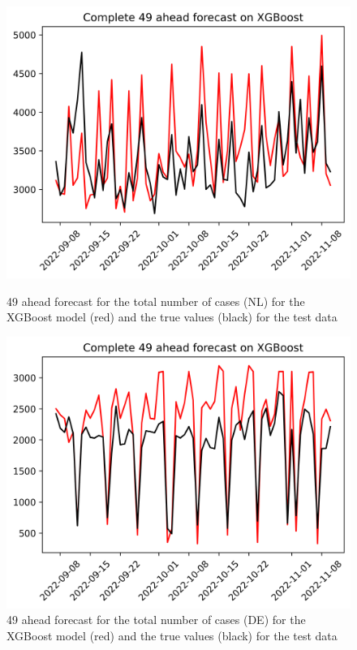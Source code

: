 \begin{figure}

\begin{minipage}{.45\textwidth}
  \centering
  \includegraphics[width=\linewidth]{pics/49_ah/Complete_49_ahead_XGBoost.png}
  \caption{49 ahead forecast for the total number of cases (NL) for the XGBoost model (red) and the true values (black) for the test data}
  \label{fig:tot_cases_fc_49_xgb}
\end{minipage}
\begin{minipage}{.45\textwidth}
  \centering
  \includegraphics[width=\linewidth]{pics/49_ah/DE_Complete_49_ahead_XGBoost.png}
  \caption{49 ahead forecast for the total number of cases (DE) for the XGBoost model (red) and the true values (black) for the test data}
  \label{fig:tot_cases_fc_49_xgb_DE}
\end{minipage}

\end{figure}
